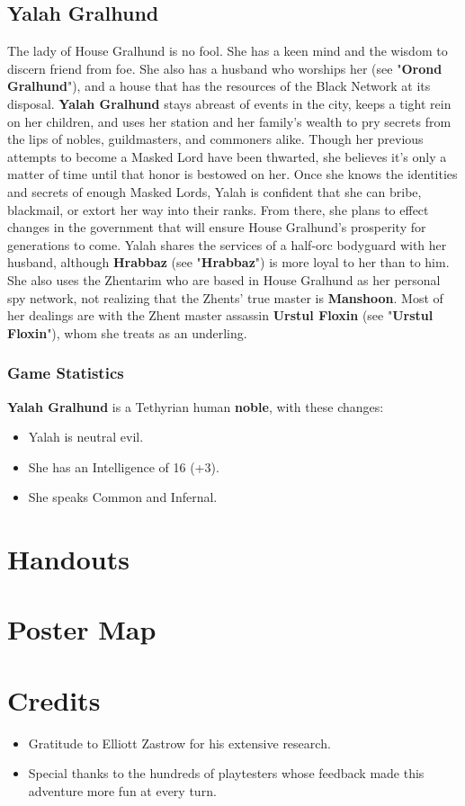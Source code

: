 \documentclass[10pt,a4paper,twoside,twocolumn,openany,nodeprecatedcode]{dndbook}
\begin{document}
\section{Yalah Gralhund}
The lady of House Gralhund is no fool. She has a keen mind and the wisdom to discern friend from foe. She also has a husband who worships her (see "\textbf{Orond Gralhund}"), and a house that has the resources of the Black Network at its disposal.
\textbf{Yalah Gralhund} stays abreast of events in the city, keeps a tight rein on her children, and uses her station and her family's wealth to pry secrets from the lips of nobles, guildmasters, and commoners alike. Though her previous attempts to become a Masked Lord have been thwarted, she believes it's only a matter of time until that honor is bestowed on her. Once she knows the identities and secrets of enough Masked Lords, Yalah is confident that she can bribe, blackmail, or extort her way into their ranks. From there, she plans to effect changes in the government that will ensure House Gralhund's prosperity for generations to come.
Yalah shares the services of a half-orc bodyguard with her husband, although \textbf{Hrabbaz} (see "\textbf{Hrabbaz}") is more loyal to her than to him. She also uses the Zhentarim who are based in House Gralhund as her personal spy network, not realizing that the Zhents' true master is \textbf{Manshoon}. Most of her dealings are with the Zhent master assassin \textbf{Urstul Floxin} (see "\textbf{Urstul Floxin}"), whom she treats as an underling.
\subsection{Game Statistics}
\textbf{Yalah Gralhund} is a Tethyrian human \textbf{noble}, with these changes:
\begin{itemize}

\item Yalah is neutral evil.
\item She has an Intelligence of 16 (+3).
\item She speaks Common and Infernal.
\end{itemize}


\chapter{Handouts}
\chapter{Poster Map}
\chapter{Credits}
\begin{itemize}

\item Gratitude to Elliott Zastrow for his extensive research.
\item Special thanks to the hundreds of playtesters whose feedback made this adventure more fun at every turn.
\end{itemize}
\end{document}
